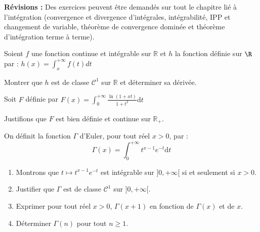 \documentclass[twoside,a4paper,french,10pt]{VcCours}
\newcommand{\dt}{\text{d}t}
\begin{document}
\medskip
      \textbf{Révisions :} Des exercices peuvent être demandés sur tout le chapitre lié à l'intégration (convergence et divergence d'intégrales, intégrabilité, IPP et changement de variable, théorème de convergence dominée et théorème d'intégration terme à terme).
      
\bigskip

    \begin{Exercice}
      Soient $f$ une fonction continue et intégrable sur $\mathbb{R}$ et $h$ la 
      fonction définie sur $\R$ par :
      $ h(x) = \int_x^{+ \infty} f(t) dt$

      Montrer que $h$ est de classe $\mathcal{C}^1$ sur $\mathbb{R}$ et déterminer sa dérivée.
    \end{Exercice}

      \begin{Exercice}
        Soit $F$ définie par 
      $ F(x) = \int_{0}^{+ \infty} \frac{\ln(1+xt)}{1+t^2} \dt$

      Justifions que $F$ est bien définie et continue sur $\mathbb{R}_+$.
    \end{Exercice}


       
      \begin{Exercice}
      On définit la fonction $\Gamma$ d'Euler, pour tout réel $x>0$, par :
      $$ \Gamma(x) = \int_{0}^{+ \infty} t^{x-1} e^{-t} \dt$$
      
      \begin{enumerate}
      \item Montrons que $t \mapsto  t^{x-1} e^{-t}$ est intégrable sur $]0, + \infty[$ si et seulement si $x>0$.
      \item Justifier que $\Gamma$ est de classe $\mathcal{C}^1$ sur $]0, + \infty[$.
      \item Exprimer pour tout réel $x>0$, $\Gamma(x+1)$ en fonction de $\Gamma(x)$ et de $x$.
      \item Déterminer $\Gamma(n)$ pour tout $n \geq 1$.
      \end{enumerate}
    \end{Exercice}
\end{document}
